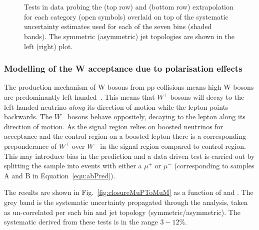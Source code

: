 \begin{figure}[h!]
  \begin{center}
    ~~
    \\
    ~~

    \caption{Tests in data probing the \alphat (top row) and \bdphi (bottom row) extrapolation for each
      \njet category (open symbols) overlaid on top of the systematic
      uncertainty estimates used for each of the seven \scalht bins (shaded bands). 
      The symmetric (asymmetric) jet topologies are shown in the left (right) plot. 
    }
    \label{fig:closureAlphaT}
  \end{center} 
\end{figure}
\subsubsection{Modelling of the W acceptance due to polarisation effects}

The production mechanism of W bosons from pp collisions means high \pt W bosons are predominantly left 
handed~\cite{lhW}. This means that $W^{+}$ bosons will decay to the left handed neutrino \emph{along}
its direction of motion while the lepton points backwards. The $W^{-}$ bosons behave oppositely, decaying
to the lepton along its direction of motion. As the signal region relies on boosted neutrinos 
for acceptance and the \mj control region on a boosted lepton there is a corresponding preponderance
of $W^{+}$ over $W^{-}$ in the signal region compared to \mj control region. This may introduce bias
in the prediction and a data driven test is carried out by splitting the \mj sample into events 
with either a $\mu^{+}$ or $\mu^{-}$ (corresponding to samples A and B in Equation~\ref{equ:abPred}).

The results are shown in Fig.~\ref{fig:closureMuPToMuM} as a function of \scalht and \njet. 
The grey band is the systematic uncertainty propagated through the analysis, 
taken as un-correlated per each \scalht bin and jet topology (symmetric/asymmetric).
The systematic derived from these tests is in the range $3-12\%$.



